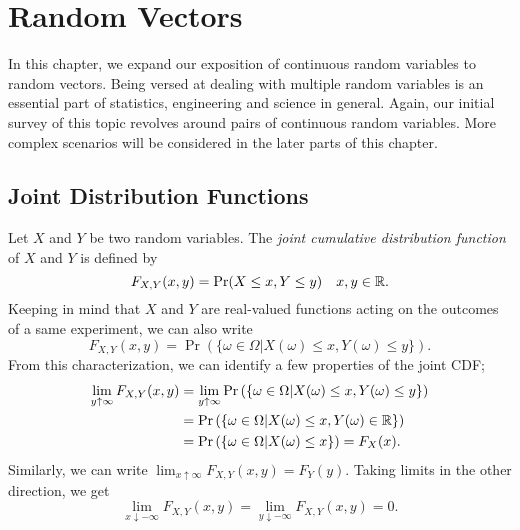 \chapter{Random Vectors}

In this chapter, we expand our exposition of continuous random variables to random vectors.
Being versed at dealing with multiple random variables is an essential part of statistics, engineering and science in general.
Again, our initial survey of this topic revolves around pairs of continuous random variables.
More complex scenarios will be considered in the later parts of this chapter.


\section{Joint Distribution Functions}

Let $X$ and $Y$ be two random variables.
The \emph{joint cumulative distribution function} of $X$ and $Y$ is defined by 
\begin{equation*}
F_{X,Y} (x, y) = \Pr (X \leq x, Y \leq y) \quad x, y \in \mathbb{R} .
\end{equation*}
Keeping in mind that $X$ and $Y$ are real-valued functions acting on the outcomes of a same experiment, we can also write
\begin{equation*}
F_{X,Y} (x, y) = \Pr \left( \{ \omega \in \Omega | X(\omega) \leq x, Y(\omega) \leq y \} \right) .
\end{equation*}
From this characterization, we can identify a few properties of the joint CDF;
\begin{equation*}
\begin{split}
\lim_{y \uparrow \infty} F_{X,Y} (x, y)
&= \lim_{y \uparrow \infty} \Pr \left( \{ \omega \in \Omega | X(\omega) \leq x, Y(\omega) \leq y \} \right) \\
&= \Pr \left( \{ \omega \in \Omega | X(\omega) \leq x, Y(\omega) \in \mathbb{R} \} \right) \\
&= \Pr \left( \{ \omega \in \Omega | X(\omega) \leq x \} \right)
= F_X (x) .
\end{split}
\end{equation*}
Similarly, we can write $\lim_{x \uparrow \infty} F_{X,Y} (x,y) = F_Y (y)$.
Taking limits in the other direction, we get
\begin{equation*}
\lim_{x \downarrow -\infty} F_{X,Y} (x,y) 
= \lim_{y \downarrow -\infty} F_{X,Y} (x,y) = 0 .
\end{equation*}

